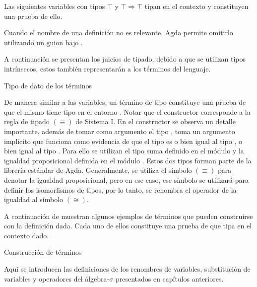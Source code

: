 \begin{example}
	Las siguientes variables con tipos $\top$ y $\top \Rightarrow \top$ tipan en el contexto \const{$\emptyset , \top \Rightarrow \top , \top$} y constituyen una prueba de ello.
	
	Cuando el nombre de una definición no es relevante, Agda permite omitirlo utilizando un guion bajo \func{\_}.
	
\end{example}

A continuación se presentan los juicios de tipado, debido a que se utilizan tipos intrínsecos, estos también representarán a los términos del lenguaje.

\begin{codigo}
	Tipo de dato de los términos
	
\end{codigo}

De manera similar a las variables, un término de tipo \bound{$\Gamma$} \type{$\vdash$}  constituye una prueba de que el mismo tiene tipo  en el entorno \bound{$\Gamma$}.
Notar que el constructor  corresponde a la regla de tipado $(\equiv)$ de Sistema I.
En el constructor \const{$\pi$} se observa un detalle importante, además de tomar como argumento el tipo , toma un argumento implícito que funciona como evidencia de que el tipo  es o bien igual al tipo , o bien igual al tipo .
Para ello se utilizan el tipo suma \type{$\_\uplus\_$} definido en el módulo  y la igualdad proposicional \type{$\_\cong\_$} definida en el módulo .
Estos dos tipos forman parte de la librería estándar de Agda.
Generalmente, se utiliza el símbolo $(\equiv)$ para denotar la igualdad proposicional, pero en ese caso, ese símbolo se utilizará para definir los isomorfismos de tipos, por lo tanto, se renombra el operador de la igualdad al símbolo $(\cong)$.

A continuación de muestran algunos ejemplos de términos que pueden construirse con la definición dada.
Cada uno de ellos constituye una prueba de que tipa en el contexto dado.

\begin{example}
	Construcción de términos
\end{example}

Aquí se introducen las definiciones de los renombres de variables, substitución de variables y operadores del álgebra-$\sigma$ presentados en capítulos anteriores.

